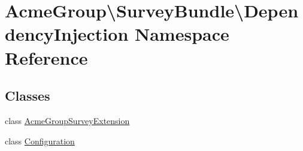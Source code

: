 \hypertarget{namespace_acme_group_1_1_survey_bundle_1_1_dependency_injection}{\section{Acme\+Group\textbackslash{}Survey\+Bundle\textbackslash{}Dependency\+Injection Namespace Reference}
\label{namespace_acme_group_1_1_survey_bundle_1_1_dependency_injection}
}
\subsection*{Classes}
\begin{DoxyCompactItemize}
\item 
class \hyperlink{class_acme_group_1_1_survey_bundle_1_1_dependency_injection_1_1_acme_group_survey_extension}{Acme\+Group\+Survey\+Extension}
\item 
class \hyperlink{class_acme_group_1_1_survey_bundle_1_1_dependency_injection_1_1_configuration}{Configuration}
\end{DoxyCompactItemize}

